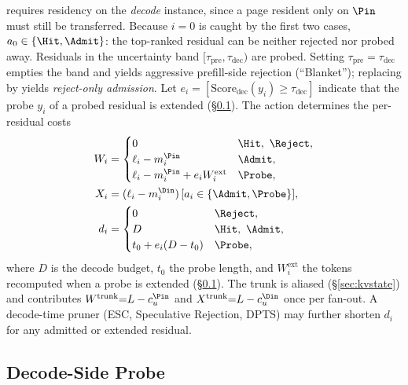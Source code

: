 \noindent
\Hit requires residency on the \emph{decode} instance, since a page resident only on $\Pin$ must still be transferred.
Because $i{=}0$ is caught by the first two cases, $a_0\in\{\Hit,\Admit\}$: the top-ranked residual can be neither rejected nor probed away.
Residuals in the uncertainty band $[\tau_{\mathrm{pre}},\tau_{\mathrm{dec}})$ are probed.
Setting $\tau_{\mathrm{pre}}{=}\tau_{\mathrm{dec}}$ empties the band and yields aggressive prefill-side rejection (``Blanket''); replacing \Probe by \Admit yields \emph{reject-only admission}.
Let $e_i{=}[\mathrm{Score}_{\mathrm{dec}}(y_i)\ge\tau_{\mathrm{dec}}]$ indicate that the probe $y_i$ of a probed residual is extended (\S\ref{sec:split}).
The action determines the per-residual costs
\begin{align}
W_i &=
\begin{cases}
0 & \Hit,\ \Reject,\\
\ell_i-m_i^{\Pin} & \Admit,\\
\ell_i-m_i^{\Pin}+e_iW_i^{\mathrm{ext}} & \Probe,
\end{cases}
\label{eq:work}\\
X_i &= (\ell_i-m_i^{\Din})\,[a_i\in\{\Admit,\Probe\}],
\label{eq:xfer}\\
d_i &=
\begin{cases}
0 & \Reject,\\
D & \Hit,\ \Admit,\\
t_0+e_i(D-t_0) & \Probe,
\end{cases}
\label{eq:dec}
\end{align}
where $D$ is the decode budget, $t_0$ the probe length, and $W_i^{\mathrm{ext}}$ the tokens recomputed when a probe is extended (\S\ref{sec:split}).
The trunk is aliased (\S\ref{sec:kvstate}) and contributes $W^{\mathrm{trunk}}{=}L-c_u^{\Pin}$ and $X^{\mathrm{trunk}}{=}L-c_u^{\Din}$ once per fan-out.
A decode-time pruner (ESC, Speculative Rejection, DPTS) may further shorten $d_i$ for any admitted or extended residual.

\subsection{Decode-Side Probe}
\label{sec:split}

